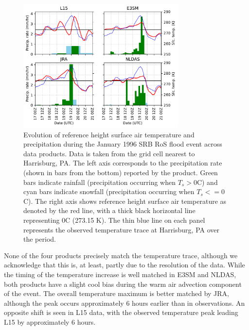 \documentclass[nhess, manuscript]{copernicus}
\begin{document}

\begin{figure}
\noindent\includegraphics[width=0.75\textwidth]{figs/cropped/precip_vs_t_1996.pdf}
\caption{Evolution of reference height surface air temperature and precipitation during the January 1996 SRB RoS flood event across data products. Data is taken from the grid cell nearest to Harrisburg, PA. The left axis corresponds to the precipitation rate (shown in bars from the bottom) reported by the product. Green bars indicate rainfall (precipitation occurring when $T_s > 0$\degree{}C) and cyan bars indicate snowfall (precipitation occurring when $T_s <= 0$\degree{}C). The right axis shows reference height surface air temperature as denoted by the red line, with a thick black horizontal line representing 0\degree{}C (273.15 K). The thin blue line on each panel represents the observed temperature trace at Harrisburg, PA over the period.}
\label{fig:1996eventtrace}
\end{figure}

None of the four products precisely match the temperature trace, although we acknowledge that this is, at least, partly due to the resolution of the data. 
While the timing of the temperature increase is well matched in E3SM and NLDAS, both products have a slight cool bias during the warm air advection component of the event. 
The overall temperature maximum is better matched by JRA, although the peak occurs approximately 6 hours earlier than in observations. An opposite shift is seen in L15 data, with the observed temperature peak leading L15 by approximately 6 hours.
\end{document}
